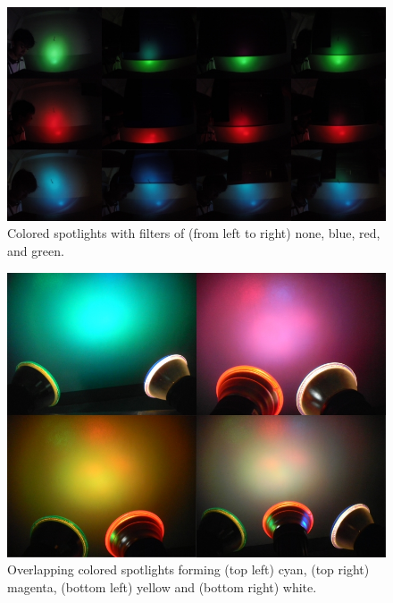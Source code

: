 \documentclass[twoside]{article}
\begin{document}
\captionsetup[figure]{width=5in}
\begin{figure}[h!]
\centering
\includegraphics[scale=0.5]{filters}
\caption{Colored spotlights with filters of (from left to right) none, blue, red, and green.}
\label{fig:phasediff}
\end{figure}

\captionsetup[figure]{width=5in}
\begin{figure}[h!]
\centering
\includegraphics[scale=0.4]{add}
\caption{Overlapping colored spotlights forming (top left) cyan, (top right) magenta, (bottom left) yellow and (bottom right) white.}
\label{fig:phasediff}
\end{figure}
\end{document}
